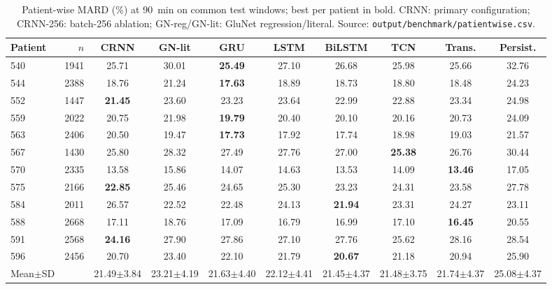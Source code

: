 \begin{table}[t]\centering
\caption{Patient-wise MARD (\%) at 90~min on common test windows; best per patient in bold. CRNN: primary configuration; CRNN-256: batch-256 ablation; GN-reg/GN-lit: GluNet regression/literal. Source: \texttt{output/benchmark/patientwise.csv}.}
\scriptsize\setlength{\tabcolsep}{3pt}
\begin{tabular}{lrcccccccc}\toprule
Patient & $n$ & CRNN & GN-lit & GRU & LSTM & BiLSTM & TCN & Trans. & Persist.\\\midrule
540 & 1941 & 25.71 & 30.01 & \textbf{25.49} & 27.10 & 26.68 & 25.98 & 25.66 & 32.76\\
544 & 2388 & 18.76 & 21.24 & \textbf{17.63} & 18.89 & 18.73 & 18.80 & 18.48 & 24.23\\
552 & 1447 & \textbf{21.45} & 23.60 & 23.23 & 23.64 & 22.99 & 22.88 & 23.34 & 24.98\\
559 & 2022 & 20.75 & 21.98 & \textbf{19.79} & 20.40 & 20.10 & 20.16 & 20.73 & 24.09\\
563 & 2406 & 20.50 & 19.47 & \textbf{17.73} & 17.92 & 17.74 & 18.98 & 19.03 & 21.57\\
567 & 1430 & 25.80 & 28.32 & 27.49 & 27.76 & 27.00 & \textbf{25.38} & 26.76 & 30.44\\
570 & 2335 & 13.58 & 15.86 & 14.07 & 14.63 & 13.53 & 14.09 & \textbf{13.46} & 17.05\\
575 & 2166 & \textbf{22.85} & 25.46 & 24.65 & 25.30 & 23.23 & 24.31 & 23.58 & 27.78\\
584 & 2011 & 26.57 & 22.52 & 22.48 & 24.13 & \textbf{21.94} & 23.31 & 24.27 & 23.11\\
588 & 2668 & 17.11 & 18.76 & 17.09 & 16.79 & 16.99 & 17.10 & \textbf{16.45} & 20.55\\
591 & 2568 & \textbf{24.16} & 27.90 & 27.86 & 27.10 & 27.76 & 25.62 & 28.16 & 28.54\\
596 & 2456 & 20.70 & 23.40 & 22.10 & 21.79 & \textbf{20.67} & 21.18 & 20.94 & 25.90\\
\midrule
Mean$\pm$SD & & 21.49$\pm$3.84 & 23.21$\pm$4.19 & 21.63$\pm$4.40 & 22.12$\pm$4.41 & 21.45$\pm$4.37 & 21.48$\pm$3.75 & 21.74$\pm$4.37 & 25.08$\pm$4.37\\
\bottomrule
\end{tabular}\end{table}
